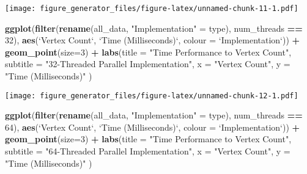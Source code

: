 \documentclass[]{article}
\newenvironment{Shaded}{\begin{snugshade}}{\end{snugshade}}
\newcommand{\KeywordTok}[1]{\textcolor[rgb]{0.13,0.29,0.53}{\textbf{#1}}}
\newcommand{\DataTypeTok}[1]{\textcolor[rgb]{0.13,0.29,0.53}{#1}}
\newcommand{\DecValTok}[1]{\textcolor[rgb]{0.00,0.00,0.81}{#1}}
\newcommand{\StringTok}[1]{\textcolor[rgb]{0.31,0.60,0.02}{#1}}
\newcommand{\OperatorTok}[1]{\textcolor[rgb]{0.81,0.36,0.00}{\textbf{#1}}}
\newcommand{\NormalTok}[1]{#1}
\begin{document}
\texttt{[image: figure\_generator\_files/figure-latex/unnamed-chunk-11-1.pdf]}

\begin{Shaded}
\begin{Highlighting}[]
\KeywordTok{ggplot}\NormalTok{(}\KeywordTok{filter}\NormalTok{(}\KeywordTok{rename}\NormalTok{(all_data, }\StringTok{"Implementation"}\NormalTok{ =}\StringTok{ }\NormalTok{type), num_threads }\OperatorTok{==}\StringTok{ }\DecValTok{32}\NormalTok{), }
              \KeywordTok{aes}\NormalTok{(}\StringTok{`}\DataTypeTok{Vertex Count}\StringTok{`}\NormalTok{, }\StringTok{`}\DataTypeTok{Time (Milliseconds)}\StringTok{`}\NormalTok{, }\DataTypeTok{colour =} \StringTok{`}\DataTypeTok{Implementation}\StringTok{`}\NormalTok{)) }\OperatorTok{+}\StringTok{ }
\StringTok{  }\KeywordTok{geom_point}\NormalTok{(}\DataTypeTok{size=}\DecValTok{3}\NormalTok{) }\OperatorTok{+}
\StringTok{  }\KeywordTok{labs}\NormalTok{(}\DataTypeTok{title =} \StringTok{"Time Performance to Vertex Count"}\NormalTok{,}
         \DataTypeTok{subtitle =} \StringTok{"32-Threaded Parallel Implementation"}\NormalTok{,}
         \DataTypeTok{x =} \StringTok{"Vertex Count"}\NormalTok{,}
         \DataTypeTok{y =} \StringTok{"Time (Milliseconds)"}
\NormalTok{        ) }
\end{Highlighting}
\end{Shaded}

\texttt{[image: figure\_generator\_files/figure-latex/unnamed-chunk-12-1.pdf]}

\begin{Shaded}
\begin{Highlighting}[]
\KeywordTok{ggplot}\NormalTok{(}\KeywordTok{filter}\NormalTok{(}\KeywordTok{rename}\NormalTok{(all_data, }\StringTok{"Implementation"}\NormalTok{ =}\StringTok{ }\NormalTok{type), num_threads }\OperatorTok{==}\StringTok{ }\DecValTok{64}\NormalTok{), }
              \KeywordTok{aes}\NormalTok{(}\StringTok{`}\DataTypeTok{Vertex Count}\StringTok{`}\NormalTok{, }\StringTok{`}\DataTypeTok{Time (Milliseconds)}\StringTok{`}\NormalTok{, }\DataTypeTok{colour =} \StringTok{`}\DataTypeTok{Implementation}\StringTok{`}\NormalTok{)) }\OperatorTok{+}\StringTok{ }
\StringTok{  }\KeywordTok{geom_point}\NormalTok{(}\DataTypeTok{size=}\DecValTok{3}\NormalTok{) }\OperatorTok{+}
\StringTok{  }\KeywordTok{labs}\NormalTok{(}\DataTypeTok{title =} \StringTok{"Time Performance to Vertex Count"}\NormalTok{,}
         \DataTypeTok{subtitle =} \StringTok{"64-Threaded Parallel Implementation"}\NormalTok{,}
         \DataTypeTok{x =} \StringTok{"Vertex Count"}\NormalTok{,}
         \DataTypeTok{y =} \StringTok{"Time (Milliseconds)"}
\NormalTok{        ) }
\end{Highlighting}
\end{Shaded}
\end{document}

